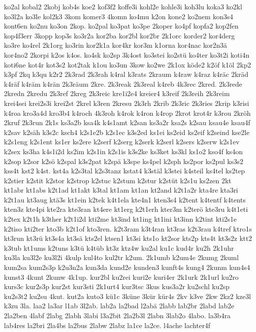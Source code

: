 {ko2al
kobal2
2kobj
kob4s
koe2
kof3f2
koffe3i
kohl2e
kohle3i
koh3lu
koka3
ko2kl
ko3l2a
ko3le
kol2k3
3kom
komer3
4komn
ko4mu
k2on
kone2
ko2nem
kon3s4
kont6en
ko2nu
ko3on
2kop.
ko2pal
ko3pat
ko3pe
2koper
ko4pf
kopfa2
kop2fen
kop4f3err
3kopp
kop3s
ko3r2a
kor2ba
kor2bl
kor2br
2k1orc
korder2
kor4derg
ko3re
ko4rel
2k1org
ko3rin
kor2k1a
kor4kr
kor3m
k1orna
kor4nac
kor2n3ä
kor4no2
2korpi
k2os
k4os.
ko4sk
ko2sp
3k4ost
ko3stei
ko2stü
ko4ter
ko3t2i
koti4n
koti6ne
kot4r
kot3s2
kot2tak
k1ou
ko3un
3kow
ko2we
2k1ox
köde2
k2öf
k1öl
2kp2
k3pf
2kq
k3qu
k2r2
2k3rad
2k3rah
k4ral
k3rats
2kraum
k4raw
k4raz
k4räc
2kräd
k4räf
k4räm
k4rän
2k3räum
2kre.
2k3reak
2k3real
k4reb
4k3rec
2kred.
2k3rede
2kredn
2kredu
2k3ref
2kreg
2k3reic
kre1i2e4
kreier4
k3reif
2k3reih
2k3reim
krei4sei
krei2s3i
krei2st
2krel
k3ren
2kresu
2k3rh
2krib
2k3ric
2k3ries
2krip
k3risi
k4roa
kro3a4d
kro3b4
k4roch
4k3roh
k4rok
k4ron
k4rop
2krot
krot4r
k3rou
2kröh
2kruf
2k3run
2k1s
ks3a2b
ksa4k
k4s1amt
k2san
ks3a2r
ksa2s
k2sau
ksau4e
ksau4f
k2sav
k2säh
k3s2c
ksch4
k2s1e2b
k2s1ec
k3s2ed
ks1ei
ks2eid
ks2eif
k2seind
kse2le
k2s1eng
k2s1ent
ks1er
ks2ere
k2serf
k2serg
k2serk
k2serl
k2sers
k2serw
k2s1ev
k2sex
ks3ha
k4s1i2d
ks2im
k2s1in
k2s1is
k3s2ke
ks3ket
ks3kl
ks1o2
kso4f
ks4on
k2sop
k2sor
k2sö
k2spal
k3s2pat
k2spä
k3spe
ks4pel
k2sph
ks2por
ks2pul
ks3s2
kss4t
kst2
k4st.
kst4a
k2s3tal
k2s3tanz
kstat4
k3stäl
k3stei
k4steil
ks4tel
ks2tep
k2stier
k2stit
k2stor
k2strop
k2stuc
k2stum
k2stur
k2stüt
k2s1u
ks2zen
2kt
kt1abr
kt1abs
k2t1ad
kt1akt
k3tal
kt1am
kt1an
kt2and
k2t1a2r
kta4re
kta3ri
k2t1au
kt3aug
ktä3s
kt1ein
k2tek
k4t1ela
kte4n1
kten3s4
k2tent
k4tentf
k4tents
kten3z
kte4pi
kte2ra
kte3ran
kt4ere
kt1erg
k2t1erh
kter3m
k2terö
kte3ru
k4t1eti
k2tex
k2t1h
k3ther
k2t1i2d
kti2me
kt3ind
kt1ing
kt1ini
kt3inn
k2tint
kti2s1e
k2tiso
kti2ter
kto3b
k2t1of
kto3ren.
k2t3ram
k3t4ran
kt3ras
k2t3rau
k4tref
ktro1s
kt3run
kt3rü
kt3s4a
kt3sä
kts2el
ktsen1
kt3si
kts1o
kt2sor
kts2p
kts4t
kt3s2z
ktt2
k3tub
kt1ums
k2tuns
k3tü
k4tüb
kt3z
ktz4w
ku2al
ku1c
kud4r
ku2h
2k1uhr
ku3la
ku3l2e
ku3l2i
4kulp
kul4to
kul2tr
k2um.
2k1umb
k2um4e
2kumg
2kuml
kum2sa
kum2s3p
k2u3n2a
kun3da
kund2e
kunden3
kunft4s
kung4
2kunm
kun4s4
kunst3
4kunt
2kunw
4k1up.
kur2bl
ku2rei
kuri2e
kuri4er
2k1urk
2k1url
ku2ro
kurs3c
kur2s3p
kur2st
kur3sti
2k1urt4
kur3tsc
3kus
kus3a2r
ku2schl
ku2sp
ku2s3t2
ku2su
4kut.
kut2a
kuto3
kü1c
3küne
3kür
kür4s
2kv
k3ve
2kw
2kz2
kze3l
k3zu
3la.
laa2
la3ar
l1ab
3l2ab.
lab2a
la2bad
l2abä
2labb
lab2br
2labd
lab2e
2la2ben
4labf
2labg
2labh
3labi
l3a2bit
2la2b3l
2labn
3lab2o
4labo.
la3b4ra
lab4res
la2bri
2la4bs
la2bus
2labw
2labz
la1ce
la2ce.
l4ache
lachter4f
}
